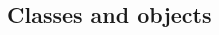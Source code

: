 \documentclass[10pt]{book}
\begin{document}
\begin{CJK}{UTF8}{gbsn}
%











\chapter{Classes and objects}


\end{CJK}
\end{document}
